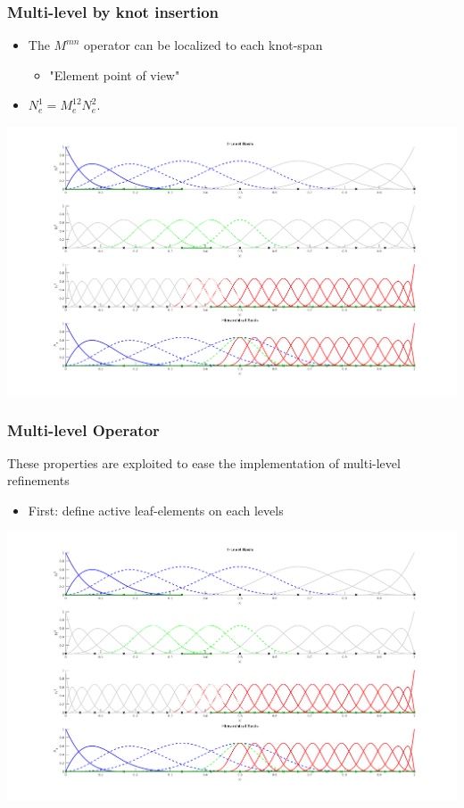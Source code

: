 \documentclass{beamer}
\begin{document}
\begin{frame}
	\frametitle{Multi-level by knot insertion}
	\begin{itemize}
		\item The $  M^{mn} $ operator can be localized to each knot-span
			\begin{itemize}
				\item "Element point of view"
			\end{itemize}
		\item $ N_e^1 = M_e^{12} N_e^2 $.
	\end{itemize}
	\centering
	\includegraphics[scale=0.23]{operators1d/multiLevelBasis.png}

\end{frame}

\begin{frame}
	\frametitle{Multi-level Operator}
		 These properties are exploited to ease the implementation of multi-level refinements
		\begin{itemize}
			\item First: define active leaf-elements on each levels
		\end{itemize}
		
		
		\includegraphics[width=\textwidth]{operators1d/multiLevelBasis.png}
		
\end{frame}
\end{document}
